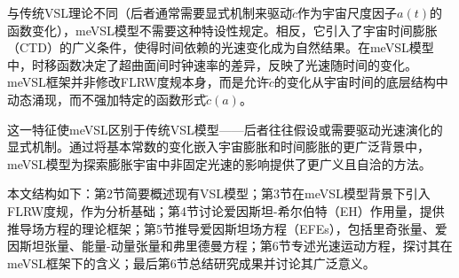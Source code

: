 \documentclass[jkps,preprint,fleqn]{revtex4}
\newcommand{\tc}{\tilde{c}}
\begin{document}
\begin{CJK*}{UTF8}{gbsn}
与传统VSL理论不同（后者通常需要显式机制来驱动$\tc$作为宇宙尺度因子$a(t)$的函数变化），meVSL模型不需要这种特设性规定。相反，它引入了宇宙时间膨胀（CTD）的广义条件，使得时间依赖的光速变化成为自然结果。在meVSL模型中，时移函数决定了超曲面间时钟速率的差异，反映了光速随时间的变化\cite{Lee:2024zcu}。meVSL框架并非修改FLRW度规本身，而是允许$\tc$的变化从宇宙时间的底层结构中动态涌现，而不强加特定的函数形式$\tc(a)$。

这一特征使meVSL区别于传统VSL模型——后者往往假设或需要驱动光速演化的显式机制\cite{Avelino:1999is,Belinchon:1999kq,Avelino:2000ph,Szydlowski:2002kz,Magueijo:2003gj,Shojaie:2004sq,Shojaie:2004xw,Balcerzak:2013kha,Balcerzak:2014rga,Franzmann:2017nsc,Hanimeli:2019wrt,Skara:2019usd,Bhattacharjee:2020fgl,Gupta:2020anq,Cuzinatto:2022mfe,Cuzinatto:2022vvy,Cuzinatto:2022dta,Bileska:2024odt,Coleman:1997xq,Albrecht:1998ir,Barrow:1998df,Barrow:1999is,Bassett:2000wj,Jacobson:2000xp,Magueijo:2000zt,Clayton:1998hv,Drummond:1999ut,Clayton:1999zs,Liberati:2000us,Clayton:2000xt,Drummond:2001rj,Amelino-Camelia:1996bln,Amelino-Camelia:1997ieq,Ellis:1999sd,Amelino-Camelia:2000bxx,Amelino-Camelia:2000cpa,Ellis:2000sf,Kowalski-Glikman:2001vvk,Bruno:2001mw,Magueijo:2001cr,Amelino-Camelia:2002uql,Magueijo:2002pg,Moffat:1992ud,Manida:1999rx,Barrow:1999st,Stepanov:1999ax,Magueijo:2000au,Moffat:2002nm,Kaelbermann:1998hu,Randall:1999ee,Randall:1999vf,Kiritsis:1999tx,Chung:1999xg,Alexander:1999cb,Ishihara:2000nf,Csaki:2000dm,Youm:2001sw,Youm:2001zk,Grojean:2001pv,Youm:2001zp,Drummond:1979pp,Novello:1988ma,Barton:1989dq,Scharnhorst:1990sr,Shore:1995fz,Colladay:1995qb,Coleman:1998ti,Bertolami:1999da,Shore:2000bs,Greenberg:2002uu,Teyssandier:2003qh,Shore:2003zc,Blasone:2003wf,Alexander:2001dr,Burgess:2002tb}。通过将基本常数的变化嵌入宇宙膨胀和时间膨胀的更广泛背景中，meVSL模型为探索膨胀宇宙中非固定光速的影响提供了更广义且自洽的方法。

本文结构如下：第2节简要概述现有VSL模型；第3节在meVSL模型背景下引入FLRW度规，作为分析基础；第4节讨论爱因斯坦-希尔伯特（EH）作用量，提供推导场方程的理论框架；第5节推导爱因斯坦场方程（EFEs），包括里奇张量、爱因斯坦张量、能量-动量张量和弗里德曼方程；第6节专述光速运动方程，探讨其在meVSL框架下的含义；最后第6节总结研究成果并讨论其广泛意义。

\end{CJK*}
\end{document}
